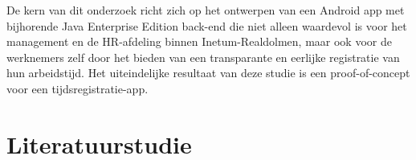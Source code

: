 De kern van dit onderzoek richt zich op het ontwerpen van een Android app met bijhorende Java Enterprise Edition back-end die niet alleen waardevol is voor het management en de HR-afdeling binnen Inetum-Realdolmen, maar ook voor de werknemers zelf door het bieden van een transparante en eerlijke registratie van hun arbeidstijd. Het uiteindelijke resultaat van deze studie is een proof-of-concept voor een tijdsregistratie-app.


\section{Literatuurstudie}%
\label{sec:state-of-the-art}







